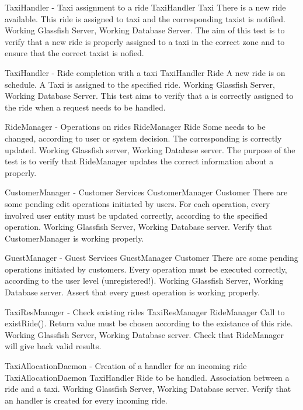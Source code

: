 \testx
{TaxiHandler - Taxi assignment to a ride}
{TaxiHandler}
{Taxi}
{There is a new ride available.}
{This ride is assigned to taxi and the corresponding taxist is notified.}
{Working Glassfish Server, Working Database Server.}
{The aim of this test is to verify that a new ride is properly assigned to 
a taxi in the correct zone and to ensure that the correct taxist is nofied.}

\testx
{TaxiHandler - Ride completion with a taxi}
{TaxiHandler}
{Ride}
{A new ride is on schedule.}
{A Taxi is assigned to the specified ride.}
{Working Glassfish Server, Working Database Server.}
{This test aims to verify that a  is correctly assigned to the ride
when a request needs to be handled.}

\testx
{RideManager - Operations on rides}
{RideManager}
{Ride}
{Some  needs to be changed, according to user or system decision.}
{The corresponding  is correctly updated.}
{Working Glassfish server, Working Database server.}
{The purpose of the test is to verify that RideManager updates the correct
information about a  properly.}

\testx
{CustomerManager - Customer Services}
{CustomerManager}
{Customer}
{There are some pending edit operations initiated by users.}
{For each operation, every involved user entity must be updated correctly, 
according to the specified operation.}
{Working Glassfish Server, Working Database server.}
{Verify that CustomerManager is working properly.}

\testx
{GuestManager - Guest Services}
{GuestManager}
{Customer}
{There are some pending operations initiated by customers.}
{Every operation must be executed correctly, according to the user level (unregistered!).}
{Working Glassfish Server, Working Database server.}
{Assert that every guest operation is working properly.}

\testx
{TaxiResManager - Check existing rides}
{TaxiResManager}
{RideManager}
{Call to existRide().}
{Return value must be chosen according to the existance of this ride.}
{Working Glassfish Server, Working Database server.}
{Check that RideManager will give back valid results.}

\testx
{TaxiAllocationDaemon - Creation of a handler for an incoming ride}
{TaxiAllocationDaemon}
{TaxiHandler}
{Ride to be handled.}
{Association between a ride and a taxi.}
{Working Glassfish Server, Working Database server.}
{Verify that an handler is created for every incoming ride.}

